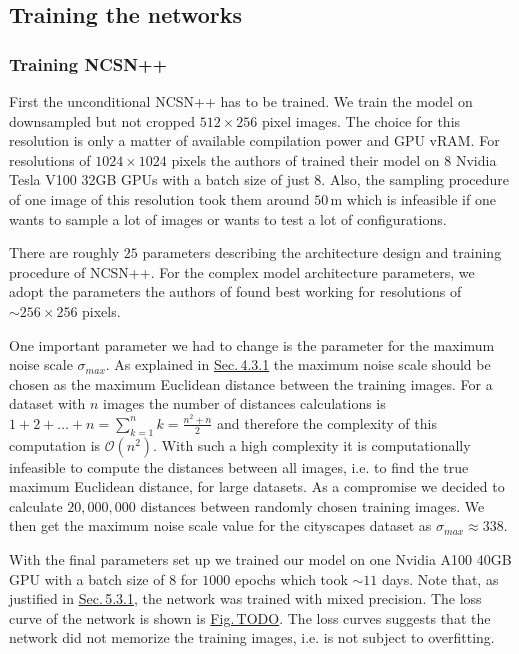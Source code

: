 \subsection{Training the networks} \label{sec:5.4.3}
\subsubsection{Training NCSN++}
First the unconditional NCSN++ has to be trained. We train the model on downsampled but not cropped $512\times256$ pixel images. The choice for this resolution is only a matter of available compilation power and GPU vRAM. For resolutions of $1024\times1024$ pixels the authors of \cite{score_3} trained their model on $8$ Nvidia Tesla V100 32GB GPUs with a batch size of just $8$. Also, the sampling procedure of one image of this resolution took them around $50$\,m which is infeasible if one wants to sample a lot of images or wants to test a lot of configurations. 

There are roughly $25$ parameters describing the architecture design and training procedure of NCSN++. For the complex model architecture parameters, we adopt the parameters the authors of \cite{score_3} found best working for resolutions of $\sim256\times256$ pixels. 

One important parameter we had to change is the parameter for the maximum noise scale $\sigma_{max}$. As explained in \hyperref[sec:4.3.1]{Sec.\,4.3.1} the maximum noise scale should be chosen as the maximum Euclidean distance between the training images. For a dataset with $n$ images the number of distances calculations is $1+2+\dots+n=\sum_{k=1}^nk=\frac{n^2+n}{2}$ and therefore the complexity of this computation is $\mathcal{O}(n^2)$. With such a high complexity it is computationally infeasible to compute the distances between all images, i.e. to find the true maximum Euclidean distance, for large datasets. As a compromise we decided to calculate $20{,}000{,}000$ distances between randomly chosen training images. We then get the maximum noise scale value for the cityscapes dataset as $\sigma_{max}\approx338$.

With the final parameters set up we trained our model on one Nvidia A100 40GB GPU with a batch size of $8$ for $1000$ epochs which took $\sim11$ days. Note that, as justified in \hyperref[sec:5.3.1]{Sec.\,5.3.1}, the network was trained with mixed precision. The loss curve of the network is shown is \hyperref[fig:]{Fig.\,TODO}. The loss curves suggests that the network did not memorize the training images, i.e. is not subject to overfitting.

